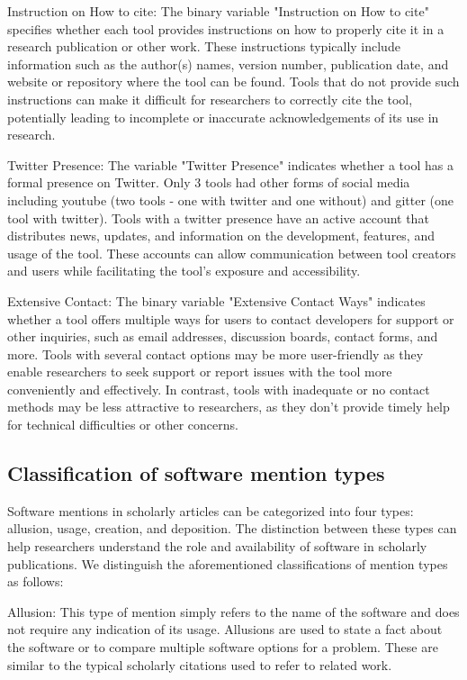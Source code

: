 Instruction on How to cite: The binary variable "Instruction on How to cite" specifies whether each tool provides instructions on how to properly cite it in a research publication or other work. These instructions typically include information such as the author(s) names, version number, publication date, and website or repository where the tool can be found. Tools that do not provide such instructions can make it difficult for researchers to correctly cite the tool, potentially leading to incomplete or inaccurate acknowledgements of its use in research.

Twitter Presence: The variable "Twitter Presence" indicates whether a tool has a formal presence on Twitter. Only 3 tools had other forms of social media including youtube (two tools - one with twitter and one without) and gitter (one tool with twitter). Tools with a twitter presence have an active account that distributes news, updates, and information on the development, features, and usage of the tool. These accounts can allow communication between tool creators and users while facilitating the tool's exposure and accessibility.

Extensive Contact: The binary variable "Extensive Contact Ways" indicates whether a tool offers multiple ways for users to contact developers for support or other inquiries, such as email addresses, discussion boards, contact forms, and more. Tools with several contact options may be more user-friendly as they enable researchers to seek support or report issues with the tool more conveniently and effectively. In contrast, tools with inadequate or no contact methods may be less attractive to researchers, as they don't provide timely help for technical difficulties or other concerns.


\subsection{Classification of software mention types}


Software mentions in scholarly articles can be categorized into four types: allusion, usage, creation, and deposition. The distinction between these types can help researchers understand the role and availability of software in scholarly publications. We distinguish the aforementioned classifications of mention types as follows:
 
Allusion: This type of mention simply refers to the name of the software and does not require any indication of its usage. Allusions are used to state a fact about the software or to compare multiple software options for a problem. These are similar to the typical scholarly citations used to refer to related work.
 
